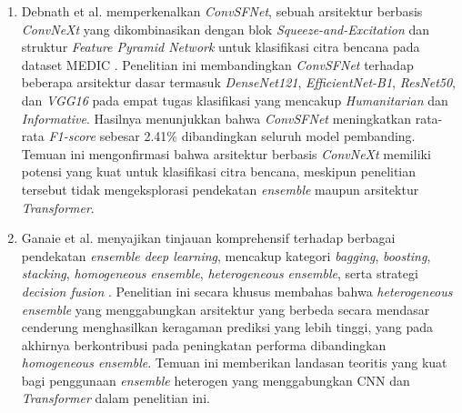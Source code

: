 \begin{enumerate}[noitemsep]
    \item Debnath et al. memperkenalkan \textit{ConvSFNet}, sebuah
    arsitektur berbasis \textit{ConvNeXt} yang dikombinasikan dengan
    blok \textit{Squeeze-and-Excitation} dan struktur \textit{Feature
    Pyramid Network} untuk klasifikasi citra bencana pada dataset MEDIC
    \cite{debnath2024convsfnet}. Penelitian ini membandingkan
    \textit{ConvSFNet} terhadap beberapa arsitektur dasar termasuk
    \textit{DenseNet121}, \textit{EfficientNet-B1}, \textit{ResNet50},
    dan \textit{VGG16} pada empat tugas klasifikasi yang mencakup
    \textit{Humanitarian} dan \textit{Informative}. Hasilnya
    menunjukkan bahwa \textit{ConvSFNet} meningkatkan rata-rata
    \textit{F1-score} sebesar 2.41\% dibandingkan seluruh model
    pembanding. Temuan ini mengonfirmasi bahwa arsitektur berbasis
    \textit{ConvNeXt} memiliki potensi yang kuat untuk klasifikasi
    citra bencana, meskipun penelitian tersebut tidak mengeksplorasi
    pendekatan \textit{ensemble} maupun arsitektur \textit{Transformer}.

    \item Ganaie et al. menyajikan tinjauan komprehensif terhadap
    berbagai pendekatan \textit{ensemble deep learning}, mencakup
    kategori \textit{bagging}, \textit{boosting}, \textit{stacking},
    \textit{homogeneous ensemble}, \textit{heterogeneous ensemble},
    serta strategi \textit{decision fusion} \cite{ganaie2022ensemble}.
    Penelitian ini secara khusus membahas bahwa \textit{heterogeneous
    ensemble} yang menggabungkan arsitektur yang berbeda secara
    mendasar cenderung menghasilkan keragaman prediksi yang lebih
    tinggi, yang pada akhirnya berkontribusi pada peningkatan performa
    dibandingkan \textit{homogeneous ensemble}. Temuan ini memberikan
    landasan teoritis yang kuat bagi penggunaan \textit{ensemble}
    heterogen yang menggabungkan CNN dan \textit{Transformer} dalam
    penelitian ini.
\end{enumerate}

